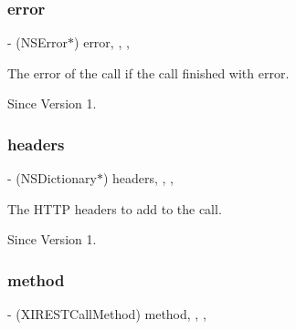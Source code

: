 \subsubsection{\texorpdfstring{error}{error}}
{\footnotesize\ttfamily -\/ (N\+S\+Error$\ast$) error\hspace{0.3cm}{\ttfamily [read]}, {\ttfamily [write]}, {\ttfamily [nonatomic]}, {\ttfamily [strong]}}



The error of the call if the call finished with error. 

\begin{DoxySince}{Since}
Version 1. 
\end{DoxySince}
\hypertarget{category_x_i_robust_r_e_s_t_call_07_08_ac73826c3921c0612f0ddbfff7667566a}{}\label{category_x_i_robust_r_e_s_t_call_07_08_ac73826c3921c0612f0ddbfff7667566a} 
\subsubsection{\texorpdfstring{headers}{headers}}
{\footnotesize\ttfamily -\/ (N\+S\+Dictionary$\ast$) headers\hspace{0.3cm}{\ttfamily [read]}, {\ttfamily [write]}, {\ttfamily [nonatomic]}, {\ttfamily [strong]}}



The H\+T\+TP headers to add to the call. 

\begin{DoxySince}{Since}
Version 1. 
\end{DoxySince}
\hypertarget{category_x_i_robust_r_e_s_t_call_07_08_aa1832057faed9fc9e60ff583ec8becf2}{}\label{category_x_i_robust_r_e_s_t_call_07_08_aa1832057faed9fc9e60ff583ec8becf2} 
\subsubsection{\texorpdfstring{method}{method}}
{\footnotesize\ttfamily -\/ (X\+I\+R\+E\+S\+T\+Call\+Method) method\hspace{0.3cm}{\ttfamily [read]}, {\ttfamily [write]}, {\ttfamily [nonatomic]}, {\ttfamily [assign]}}



